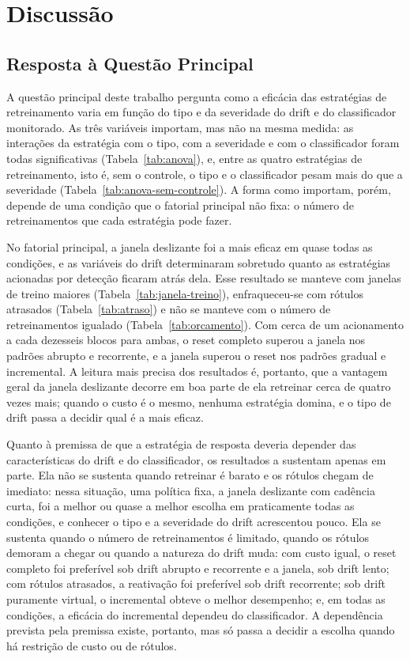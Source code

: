 \chapter{Discussão}
\label{chap:discussao}

\section{Resposta à Questão Principal}

A questão principal deste trabalho pergunta como a eficácia das estratégias
de retreinamento varia em função do tipo e da severidade do drift e do
classificador monitorado. As três variáveis importam, mas não na mesma
medida: as interações da estratégia com o tipo, com a severidade e com o
classificador foram todas significativas (Tabela~\ref{tab:anova}), e, entre
as quatro estratégias de retreinamento, isto é, sem o controle, o tipo e o
classificador pesam mais do que a severidade
(Tabela~\ref{tab:anova-sem-controle}). A forma como importam, porém, depende de uma
condição que o fatorial principal não fixa: o número de retreinamentos que
cada estratégia pode fazer.

No fatorial principal, a janela deslizante foi a mais eficaz em quase todas
as condições, e as variáveis do drift determinaram sobretudo quanto as
estratégias acionadas por detecção ficaram atrás dela. Esse resultado se
manteve com janelas de treino maiores (Tabela~\ref{tab:janela-treino}),
enfraqueceu-se com rótulos atrasados (Tabela~\ref{tab:atraso}) e não se
manteve com o número de retreinamentos igualado (Tabela~\ref{tab:orcamento}).
Com cerca de um acionamento a cada dezesseis blocos para ambas, o reset
completo superou a janela nos padrões abrupto e recorrente, e a janela
superou o reset nos padrões gradual e incremental. A leitura mais precisa
dos resultados é, portanto, que a vantagem geral da janela deslizante decorre
em boa parte de ela retreinar cerca de quatro vezes mais; quando o custo é o
mesmo, nenhuma estratégia domina, e o tipo de drift passa a decidir qual é a
mais eficaz.

Quanto à premissa de que a estratégia de resposta deveria depender das
características do drift e do classificador, os resultados a sustentam
apenas em parte. Ela não se sustenta quando retreinar é barato e os rótulos
chegam de imediato: nessa situação, uma política fixa, a janela deslizante
com cadência curta, foi a melhor ou quase a melhor escolha em praticamente
todas as condições, e conhecer o tipo e a severidade do drift acrescentou
pouco. Ela se sustenta quando o número de retreinamentos é limitado, quando
os rótulos demoram a chegar ou quando a natureza do drift muda: com custo
igual, o reset completo foi preferível sob drift abrupto e recorrente e a
janela, sob drift lento; com rótulos atrasados, a reativação foi preferível
sob drift recorrente; sob drift puramente virtual, o incremental obteve o
melhor desempenho; e, em todas as condições, a eficácia do incremental
dependeu do classificador. A dependência prevista pela premissa existe,
portanto, mas só passa a decidir a escolha quando há restrição de custo ou
de rótulos.


